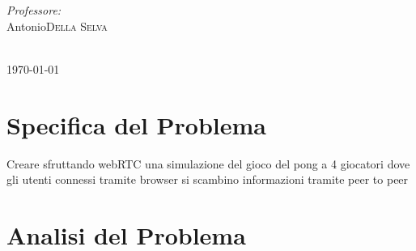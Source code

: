 ﻿\documentclass[11pt, a4paper, titlepage, block]{article}
\begin{document}
\begin{titlepage}
		\begin{minipage}{\textwidth}
			\begin{flushright}
				\emph{Professore:} \\
				 Antonio\textsc{Della Selva}\\ %
			\end{flushright}
		\end{minipage}\\[4cm]

		{\today}\\[1cm]



		\newpage
		\tableofcontents
		\newpage

	\end{titlepage}

	\section{Specifica del Problema}
Creare sfruttando webRTC una simulazione del gioco del pong a 4 giocatori dove gli utenti connessi tramite browser si scambino informazioni tramite peer to peer

	\section{Analisi del Problema}
\end{document}
